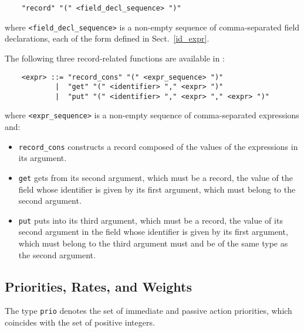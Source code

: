 	\begin{verbatim}
    "record" "(" <field_decl_sequence> ")"
	\end{verbatim}

\noindent where {\tt <field\_decl\_sequence>} is a non-empty sequence of comma-separated field declarations,
each of the form defined in Sect.~\ref{id_expr}.

The following three record-related functions are available in \aemilia:

	\begin{verbatim}
    <expr> ::= "record_cons" "(" <expr_sequence> ")"
            |  "get" "(" <identifier> "," <expr> ")"
            |  "put" "(" <identifier> "," <expr> "," <expr> ")"
	\end{verbatim}

\noindent where {\tt <expr\_sequence>} is a non-empty sequence of comma-separated expressions and:

	\begin{itemize}

\item {\tt record\_cons} constructs a record composed of the values of the expressions in its argument.

\item {\tt get} gets from its second argument, which must be a record, the value of the field whose
identifier is given by its first argument, which must belong to the second argument.

\item {\tt put} puts into its third argument, which must be a record, the value of its second argument in
the field whose identifier is given by its first argument, which must belong to the third argument must and
be of the same type as the second argument.

	\end{itemize}


\subsection{Priorities, Rates, and Weights}

The type {\tt prio} denotes the set of immediate and passive action priorities, which coincides with the set
of positive integers.


